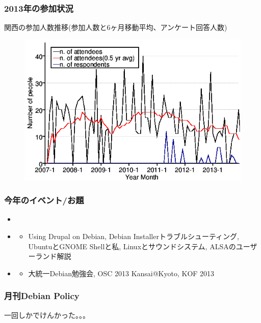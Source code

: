 \documentclass[cjk,dvipdfmx,10pt,compress,%
hyperref={bookmarks=true,bookmarksnumbered=true,bookmarksopen=false,%
colorlinks=false,%
pdftitle={第 79 回 関西 Debian 勉強会},%
pdfauthor={倉敷・のがた・佐々木・かわだ・八津尾},%
pdfsubject={資料},%
}]{beamer}
\begin{document}
\begin{frame}
  \frametitle{2013年の参加状況}
  \centering
  関西の参加人数推移(参加人数と6ヶ月移動平均、アンケート回答人数)
  \begin{figure}[h]
    \begin{center}
      \includegraphics[width=.6\hsize]{image201312/memberanalysis/kansai.png}
    \end{center}
  \end{figure}
\end{frame}

\begin{frame}
  \frametitle{今年のイベント/お題}
  \begin{itemize}
  \item \color[rgb]{1,0,0}{月刊Debian Policy, GNOMEネタ}
  \item \color[rgb]{0,0,1}{コミュニティ}
    \begin{itemize}
    \item Using Drupal on Debian, Debian Installerトラブルシューティング,
      UbuntuとGNOME Shellと私, Linuxとサウンドシステム, ALSAのユーザーランド解説
    \end{itemize}
  \item \color[rgb]{0,.5,.5}{イベント}
    \begin{itemize}
    \item 大統一Debian勉強会, OSC 2013 Kansai@Kyoto, KOF 2013
    \end{itemize}
  \end{itemize}
\end{frame}


\begin{frame}
  \frametitle{月刊Debian Policy}
  一回しかでけんかった。。。
\end{frame}
\end{document}
